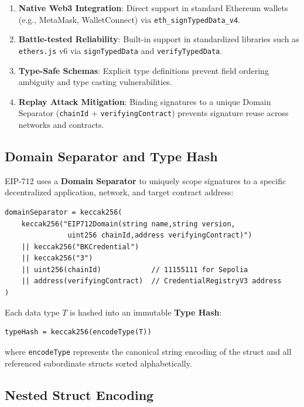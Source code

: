 \begin{enumerate}
    \item \textbf{Native Web3 Integration}: Direct support in standard Ethereum wallets (e.g., MetaMask, WalletConnect) via \texttt{eth\_signTypedData\_v4}.
    \item \textbf{Battle-tested Reliability}: Built-in support in standardized libraries such as \texttt{ethers.js} v6 via \texttt{signTypedData} and \texttt{verifyTypedData}.
    \item \textbf{Type-Safe Schemas}: Explicit type definitions prevent field ordering ambiguity and type casting vulnerabilities.
    \item \textbf{Replay Attack Mitigation}: Binding signatures to a unique Domain Separator (\texttt{chainId} + \texttt{verifyingContract}) prevents signature reuse across networks and contracts.
\end{enumerate}

\subsection{Domain Separator and Type Hash}

EIP-712 uses a \textbf{Domain Separator} to uniquely scope signatures to a specific decentralized application, network, and target contract address:

\begin{lstlisting}
domainSeparator = keccak256(
    keccak256("EIP712Domain(string name,string version,
               uint256 chainId,address verifyingContract)")
    || keccak256("BKCredential")
    || keccak256("3")
    || uint256(chainId)            // 11155111 for Sepolia
    || address(verifyingContract)  // CredentialRegistryV3 address
)
\end{lstlisting}

Each data type $T$ is hashed into an immutable \textbf{Type Hash}:

\begin{lstlisting}
typeHash = keccak256(encodeType(T))
\end{lstlisting}

where \texttt{encodeType} represents the canonical string encoding of the struct and all referenced subordinate structs sorted alphabetically.

\subsection{Nested Struct Encoding}

